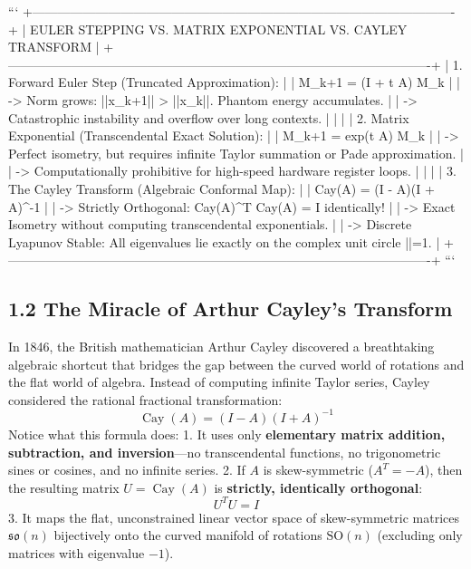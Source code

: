 \documentclass[11pt,twoside,openright]{amsbook}
\begin{document}
{{{{{{```
+----------------------------------------------------------------------------------------------------+
| EULER STEPPING VS. MATRIX EXPONENTIAL VS. CAYLEY TRANSFORM                                         |
+----------------------------------------------------------------------------------------------------+
| 1. Forward Euler Step (Truncated Approximation):                                                   |
|    M_{k+1} = (I + \Delta t A) M_k                                                                  |
|    -> Norm grows: ||x_{k+1}|| > ||x_k||. Phantom energy accumulates.                               |
|    -> Catastrophic instability and overflow over long contexts.                                    |
|                                                                                                    |
| 2. Matrix Exponential (Transcendental Exact Solution):                                             |
|    M_{k+1} = exp(\Delta t A) M_k                                                                   |
|    -> Perfect isometry, but requires infinite Taylor summation or Pade approximation.              |
|    -> Computationally prohibitive for high-speed hardware register loops.                          |
|                                                                                                    |
| 3. The Cayley Transform (Algebraic Conformal Map):                                                 |
|    Cay(A) = (I - A)(I + A)^{-1}                                                                    |
|    -> Strictly Orthogonal: Cay(A)^T Cay(A) = I identically!                                        |
|    -> Exact Isometry without computing transcendental exponentials.                                |
|    -> Discrete Lyapunov Stable: All eigenvalues lie exactly on the complex unit circle |\lambda|=1. |
+----------------------------------------------------------------------------------------------------+
```

\subsection{1.2 The Miracle of Arthur Cayley's Transform}
In 1846, the British mathematician Arthur Cayley discovered a breathtaking algebraic shortcut that bridges the gap between the curved world of rotations and the flat world of algebra.
Instead of computing infinite Taylor series, Cayley considered the rational fractional transformation:
$$\operatorname{Cay}(A) = (I - A)(I + A)^{-1}$$
Notice what this formula does:
1. It uses only \textbf{elementary matrix addition, subtraction, and inversion}—no transcendental functions, no trigonometric sines or cosines, and no infinite series.
2. If $A$ is skew-symmetric ($A^T = -A$), then the resulting matrix $U = \operatorname{Cay}(A)$ is \textbf{strictly, identically orthogonal}:
   $$U^T U = I$$
3. It maps the flat, unconstrained linear vector space of skew-symmetric matrices $\mathfrak{so}(n)$ bijectively onto the curved manifold of rotations $\mathrm{SO}(n)$ (excluding only matrices with eigenvalue $-1$).

}}}}}}
\end{document}
